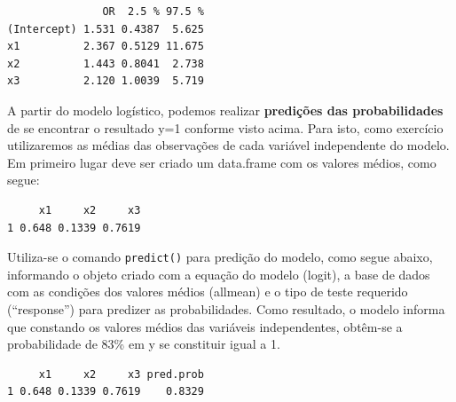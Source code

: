 \documentclass[12pt,brazil,oneside]{book}
\newenvironment{Shaded}{\begin{snugshade}}{\end{snugshade}}
\newcommand{\DataTypeTok}[1]{\textcolor[rgb]{0.13,0.29,0.53}{#1}}
\newcommand{\KeywordTok}[1]{\textcolor[rgb]{0.13,0.29,0.53}{\textbf{#1}}}
\newcommand{\NormalTok}[1]{#1}
\newcommand{\OperatorTok}[1]{\textcolor[rgb]{0.81,0.36,0.00}{\textbf{#1}}}
\newcommand{\StringTok}[1]{\textcolor[rgb]{0.31,0.60,0.02}{#1}}
\begin{document}
\begin{verbatim}
               OR  2.5 % 97.5 %
(Intercept) 1.531 0.4387  5.625
x1          2.367 0.5129 11.675
x2          1.443 0.8041  2.738
x3          2.120 1.0039  5.719
\end{verbatim}

A partir do modelo logístico, podemos realizar \textbf{predições das
probabilidades} de se encontrar o resultado y=1 conforme visto acima.
Para isto, como exercício utilizaremos as médias das observações de cada
variável independente do modelo. Em primeiro lugar deve ser criado um
data.frame com os valores médios, como segue:

\begin{Shaded}
\end{Shaded}

\begin{verbatim}
     x1     x2     x3
1 0.648 0.1339 0.7619
\end{verbatim}

Utiliza-se o comando \texttt{predict()} para predição do modelo, como
segue abaixo, informando o objeto criado com a equação do modelo
(logit), a base de dados com as condições dos valores médios (allmean) e
o tipo de teste requerido (``response'') para predizer as
probabilidades. Como resultado, o modelo informa que constando os
valores médios das variáveis independentes, obtêm-se a probabilidade de
83\% em y se constituir igual a 1.

\begin{Shaded}
\end{Shaded}

\begin{verbatim}
     x1     x2     x3 pred.prob
1 0.648 0.1339 0.7619    0.8329
\end{verbatim}
\end{document}
